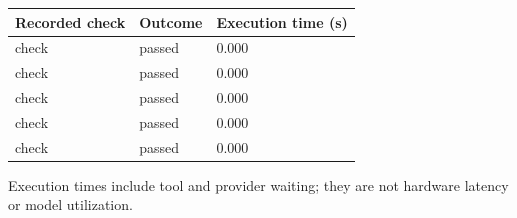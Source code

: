 \documentclass[11pt,a4paper]{article}
\begin{document}
{\small\renewcommand{\arraystretch}{1.18}\begin{longtable}{@{}L{0.57\textwidth}|L{0.16\textwidth}|L{0.17\textwidth}@{}}\toprule

\textbf{Recorded check} & \textbf{Outcome} & \textbf{Execution time (\allowbreak{}s)\allowbreak{}}\\\midrule\endhead

check & passed & 0.000\\[2pt]\hline

check & passed & 0.000\\[2pt]\hline

check & passed & 0.000\\[2pt]\hline

check & passed & 0.000\\[2pt]\hline

check & passed & 0.000\\[2pt]\hline

\bottomrule\end{longtable}}

Execution times include tool and provider waiting; they are not hardware latency or model utilization.
\end{document}
